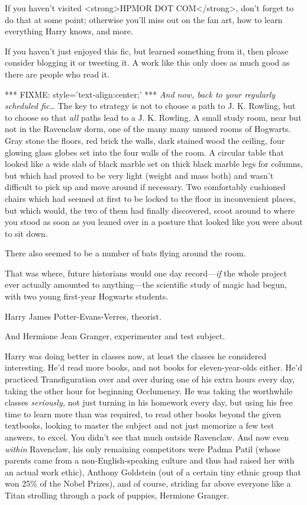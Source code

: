 If you haven't visited <strong>HPMOR DOT COM</strong>, don't forget to do that 
at some point; otherwise you'll miss out on the fan art, how to learn 
everything Harry knows, and more.

If you haven't just enjoyed this fic, but learned something from it, then 
please consider blogging it or tweeting it. A work like this only does as much 
good as there are people who read it.

*** FIXME: style='text-align:center;' ***
\emph{And now, back to your regularly scheduled fic{\ldots}}
\sbreak
The key to strategy is not to choose \emph{a} path to J. K. Rowling, but to 
choose so that \emph{all} paths lead to a J. K. Rowling.
\sbreak
A small study room, near but not in the Ravenclaw dorm, one of the many many 
unused rooms of Hogwarts. Gray stone the floors, red brick the walls, dark 
stained wood the ceiling, four glowing glass globes set into the four walls of 
the room. A circular table that looked like a wide slab of black marble set on 
thick black marble legs for columns, but which had proved to be very light 
(weight and mass both) and wasn't difficult to pick up and move around if 
necessary. Two comfortably cushioned chairs which had seemed at first to be 
locked to the floor in inconvenient places, but which would, the two of them 
had finally discovered, scoot around to where you stood as soon as you leaned 
over in a posture that looked like you were about to sit down.

There also seemed to be a number of bats flying around the room.

That was where, future historians would one day record---\emph{if} the whole 
project ever actually amounted to anything---the scientific study of magic had 
begun, with two young first-year Hogwarts students.

Harry James Potter-Evans-Verres, theorist.

And Hermione Jean Granger, experimenter and test subject.

Harry was doing better in classes now, at least the classes he considered 
interesting. He'd read more books, and not books for eleven-year-olds either. 
He'd practiced Transfiguration over and over during one of his extra hours 
every day, taking the other hour for beginning Occlumency. He was taking the 
worthwhile classes \emph{seriously,} not just turning in his homework every 
day, but using his free time to learn more than was required, to read other 
books beyond the given textbooks, looking to master the subject and not just 
memorize a few test answers, to excel. You didn't see that much outside 
Ravenclaw. And now even \emph{within} Ravenclaw, his only remaining competitors 
were Padma Patil (whose parents came from a non-English-speaking culture and 
thus had raised her with an actual work ethic), Anthony Goldstein (out of a 
certain tiny ethnic group that won 25\% of the Nobel Prizes), and of course, 
striding far above everyone like a Titan strolling through a pack of puppies, 
Hermione Granger.

